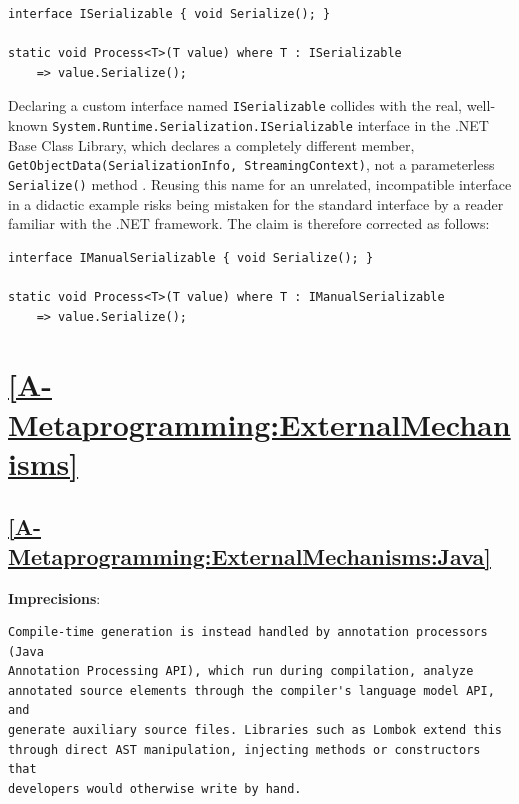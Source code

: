 \documentclass[11pt]{report}
\begin{document}
\begin{Verbatim}[breaklines=true]
interface ISerializable { void Serialize(); }

static void Process<T>(T value) where T : ISerializable
    => value.Serialize();
\end{Verbatim}

Declaring a custom interface named \texttt{ISerializable} collides with the
real, well-known \texttt{System.Runtime.Serialization.ISerializable}
interface in the .NET Base Class Library, which declares a completely
different member, \texttt{GetObjectData(SerializationInfo,
StreamingContext)}, not a parameterless \texttt{Serialize()} method
\cite{ecma335_2024}. Reusing this name for an unrelated, incompatible
interface in a didactic example risks being mistaken for the standard
interface by a reader familiar with the .NET framework. The claim is
therefore corrected as follows:

\begin{Verbatim}[breaklines=true]
interface IManualSerializable { void Serialize(); }

static void Process<T>(T value) where T : IManualSerializable
    => value.Serialize();
\end{Verbatim}

\section*{\hyperref[A-Metaprogramming:ExternalMechanisms]{\ref*{A-Metaprogramming:ExternalMechanisms} }}
\subsection*{\hyperref[A-Metaprogramming:ExternalMechanisms:Java]{\ref*{A-Metaprogramming:ExternalMechanisms:Java} }}
\noindent\textbf{Imprecisions}:

\begin{Verbatim}[breaklines=true]
Compile-time generation is instead handled by annotation processors (Java
Annotation Processing API), which run during compilation, analyze
annotated source elements through the compiler's language model API, and
generate auxiliary source files. Libraries such as Lombok extend this
through direct AST manipulation, injecting methods or constructors that
developers would otherwise write by hand.
\end{Verbatim}
\end{document}

